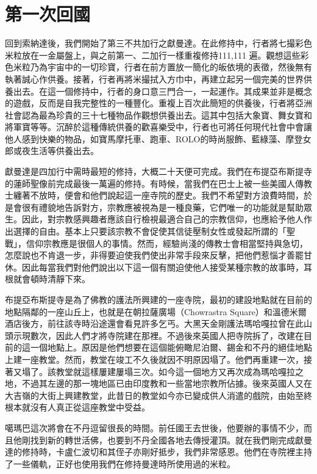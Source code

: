 \chapter{第一次回國}

回到索納達後，我們開始了第三不共加行之獻曼達。在此修持中，行者將七撮彩色米粒放在一金屬盤上，與之前第一、二加行一樣重複修持111,111
遍。觀想這些彩色米粒乃為宇宙中的一切珍寶，行者在前方置放一簡化的皈依境的表徵，然後無有執著誠心作供養。接著，行者再將米撮拭入方巾中，再建立起另一個完美的世界供養出去。在這一個修持中，行者的身口意三門合一，一起運作。其成果並非是概念的遊戲，反而是自我完整性的一種豐化。重複上百次此簡短的供養後，行者將亞洲社會認為最為珍貴的三十七種物品作觀想供養出去。這其中包括大象寶、舞女寶和將軍寶等等。沉醉於這種傳統供養的歡喜樂受中，行者也可將任何現代社會中會讓他人感到快樂的物品，如寶馬摩托車、跑車、ROLO的時尚服飾、藍綠藻、摩登女郎或夜生活等供養出去。

獻曼達是四加行中需時最短的修持，大概二十天便可完成。我們在布提亞布斯提寺的蓮師聖像前完成最後一萬遍的修持。有時候，當我們在巴士上被一些美國人傳教士纏著不放時，便會和他們說起這一座寺院的歷史。我們不希望對方浪費時間，於是會很有禮貌地告訴對方，宗教應被視為是一種良藥，它們唯一的功能就是幫助眾生。因此，對宗教感興趣者應該自行檢視最適合自己的宗教信仰，也應給予他人作出選擇的自由。基本上只要該宗教不會促使其信徒壓制女性或發起所謂的「聖戰」，信仰宗教應是很個人的事情。然而，經驗尚淺的傳教士會相當堅持與急切，怎麼說也不肯退一步，非得要迫使我們使出非常手段來反擊，把他們惹惱才善罷甘休。因此每當我們對他們說出以下這一個有關迫使他人接受某種宗教的故事時，耳根就會頓時清靜下來。

布提亞布斯提寺是為了佛教的護法所興建的一座寺院，最初的建設地點就在目前的地點隔鄰的一座山丘上，也就是在朝拉薩廣場（Chowrastra
Square）和溫德米爾酒店後方，前往該寺時沿途還會看見許多乞丐。大黑天金剛護法瑪哈嘎拉曾在此山頭示現數次，因此人們才將寺院建在那裡。不過後來英國人把寺院拆了，改建在目前的這一個地點上。原因是他們想要在這個能俯瞰尼泊爾、錫金和不丹的絕佳地點上建一座教堂。然而，教堂在竣工不久後就因不明原因塌了。他們再重建一次，接著又塌了。該教堂就這樣屢建屢塌三次。如今這一個地方又再次成為瑪哈嘎拉之地，不過其左邊的那一塊地區已由印度教和一些當地宗教所佔據。後來英國人又在大吉嶺的大街上興建教堂，此昔日的教堂如今亦已變成供人消遣的戲院，由始至終根本就沒有人真正從這座教堂中受益。

噶瑪巴這次將會在不丹逗留很長的時間。前任國王去世後，他要辦的事情不少，而且他剛找到新的轉世活佛，也要到不丹全國各地去傳授灌頂。就在我們剛完成獻曼達的修持時，卡盧仁波切和其侄子亦剛好抵步，我們非常感恩。他們在寺院裡主持了一些儀軌，正好也使用我們在修持曼達時所使用過的米粒。

